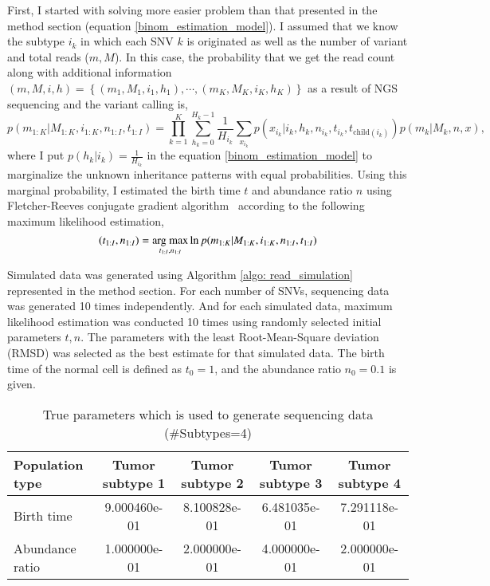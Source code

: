\documentclass{article}
\begin{document}
First, I started with solving more easier problem than that presented in the method section (equation \eqref{binom_estimation_model}).
I assumed that we know the subtype $i_k$ in which each SNV $k$ is originated as well as the number of variant and total reads ($m, M$).
In this case, the probability that we get the read count along with additional information $(m,M,i,h) = \left\{(m_1, M_1, i_1, h_1), \cdots, (m_K, M_K, i_K, h_K) \right\}$ as a result of NGS sequencing and the variant calling is,
\begin{equation}
  p(m_{1:K}|M_{1:K}, i_{1:K}, n_{1:I}, t_{1:I}) = \prod_{k=1}^{K} \sum_{h_k=0}^{H_k-1} \frac{1}{H_{i_k}} \sum_{x_{i_k}} p(x_{i_k} | i_k, h_k, n_{i_k}, t_{i_k}, t_{\mathrm{child}(i_k)}) p (m_k | M_k, n, x),
\end{equation}
where I put $p(h_k | i_k) = \frac{1}{H_{i_k}}$ in the equation \eqref{binom_estimation_model} to marginalize the unknown inheritance patterns with equal probabilities.
Using this marginal probability, I estimated the birth time $t$ and abundance ratio $n$ using Fletcher-Reeves conjugate gradient algorithm~\cite{fletcher1964function} according to the following maximum likelihood estimation,
\begin{equation}
 (t_{1:I}, n_{1:I}) = \mathop{\rm arg~max}\limits_{t_{1:I}, n_{1:I}} \ln p(m_{1:K} | M_{1:K}, i_{1:K}, n_{1:I}, t_{1:I})
\end{equation}

Simulated data was generated using Algorithm \ref{algo: read_simulation} represented in the method section.
For each number of SNVs, sequencing data was generated 10 times independently. And for each simulated data, maximum likelihood estimation was conducted 10 times using randomly selected initial parameters $t, n$. The parameters with the least Root-Mean-Square deviation (RMSD) was selected as the best estimate for that simulated data.
The birth time of the normal cell is defined as $t_{0}=1$, and the abundance ratio $n_{0} = 0.1$ is given.

\begin{table}[H]
\begin{center}
 \caption{True parameters which is used to generate sequencing data (\#Subtypes=4)}
 \label{tab: true_parameters_4_2_original}
  \begin{tabular}[t]{lcccc}\toprule
  Population type & Tumor subtype 1 & Tumor subtype 2 & Tumor subtype 3 & Tumor subtype 4\\\midrule
  Birth time & 9.000460e-01 & 8.100828e-01 & 6.481035e-01 & 7.291118e-01\\
  Abundance ratio & 1.000000e-01 & 2.000000e-01 & 4.000000e-01 & 2.000000e-01\\\bottomrule
 \end{tabular}
\end{center}
\end{table}
\end{document}
